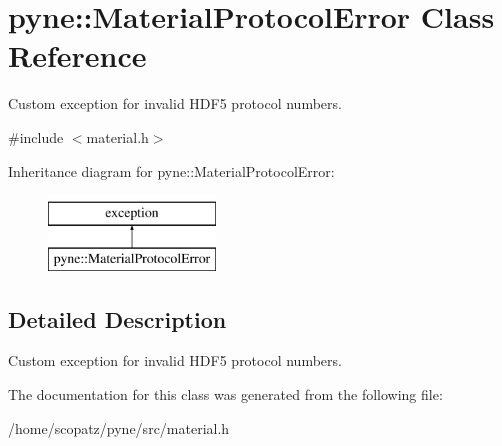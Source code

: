 \hypertarget{classpyne_1_1_material_protocol_error}{\section{pyne\-:\-:Material\-Protocol\-Error Class Reference}
\label{classpyne_1_1_material_protocol_error}
}


Custom exception for invalid H\-D\-F5 protocol numbers.  




{\ttfamily \#include $<$material.\-h$>$}

Inheritance diagram for pyne\-:\-:Material\-Protocol\-Error\-:\begin{figure}[H]
\begin{center}
\leavevmode
\includegraphics[height=2.000000cm]{classpyne_1_1_material_protocol_error}
\end{center}
\end{figure}


\subsection{Detailed Description}
Custom exception for invalid H\-D\-F5 protocol numbers. 

The documentation for this class was generated from the following file\-:\begin{DoxyCompactItemize}
\item 
/home/scopatz/pyne/src/material.\-h\end{DoxyCompactItemize}

